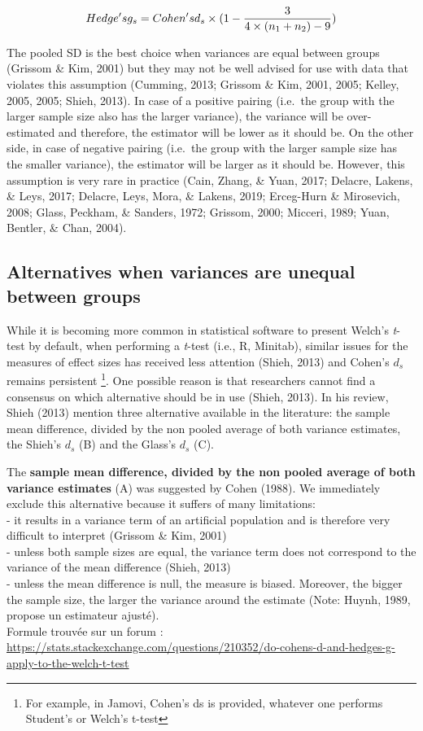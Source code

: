 \documentclass[man]{apa6}
\let\rmarkdownfootnote\footnote%
\def\footnote{\protect\rmarkdownfootnote}
\begin{document}
\begin{equation} 
Hedge's \space g_s = Cohen's \space d_s \times (1-\frac{3}{4 \times (n_1+n_2)-9}) 
\label{eq:Hedgesgs}
\end{equation}

The pooled SD is the best choice when variances are equal between groups (Grissom \& Kim, 2001) but they may not be well advised for use with data that violates this assumption (Cumming, 2013; Grissom \& Kim, 2001, 2005; Kelley, 2005, 2005; Shieh, 2013). In case of a positive pairing (i.e.~the group with the larger sample size also has the larger variance), the variance will be over-estimated and therefore, the estimator will be lower as it should be. On the other side, in case of negative pairing (i.e.~the group with the larger sample size has the smaller variance), the estimator will be larger as it should be. However, this assumption is very rare in practice (Cain, Zhang, \& Yuan, 2017; Delacre, Lakens, \& Leys, 2017; Delacre, Leys, Mora, \& Lakens, 2019; Erceg-Hurn \& Mirosevich, 2008; Glass, Peckham, \& Sanders, 1972; Grissom, 2000; Micceri, 1989; Yuan, Bentler, \& Chan, 2004).

\hypertarget{alternatives-when-variances-are-unequal-between-groups}{%
\subsection{Alternatives when variances are unequal between groups}\label{alternatives-when-variances-are-unequal-between-groups}}

While it is becoming more common in statistical software to present Welch's \emph{t}-test by default, when performing a \emph{t}-test (i.e., R, Minitab), similar issues for the measures of effect sizes has received less attention (Shieh, 2013) and Cohen's \(d_s\) remains persistent \footnote{For example, in Jamovi, Cohen's ds is provided, whatever one performs Student's or Welch's t-test}. One possible reason is that researchers cannot find a consensus on which alternative should be in use (Shieh, 2013). In his review, Shieh (2013) mention three alternative available in the literature: the sample mean difference, divided by the non pooled average of both variance estimates, the Shieh's \(d_s\) (B) and the Glass's \(d_s\) (C).

The \textbf{sample mean difference, divided by the non pooled average of both variance estimates} (A) was suggested by Cohen (1988). We immediately exclude this alternative because it suffers of many limitations:\\
- it results in a variance term of an artificial population and is therefore very difficult to interpret (Grissom \& Kim, 2001)\\
- unless both sample sizes are equal, the variance term does not correspond to the variance of the mean difference (Shieh, 2013)\\
- unless the mean difference is null, the measure is biased. Moreover, the bigger the sample size, the larger the variance around the estimate (Note: Huynh, 1989, propose un estimateur ajusté).\\
Formule trouvée sur un forum : \url{https://stats.stackexchange.com/questions/210352/do-cohens-d-and-hedges-g-apply-to-the-welch-t-test}
\end{document}
